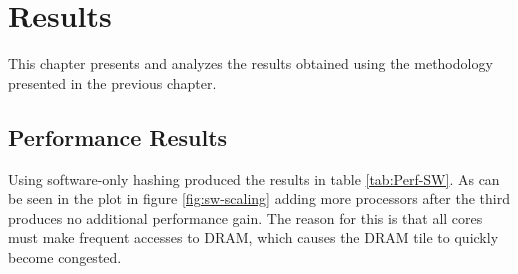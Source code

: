 \chapter{Results}

This chapter presents and analyzes the results obtained using the methodology
presented in the previous chapter.

\section{Performance Results}


 
Using software-only hashing produced the results in table \ref{tab:Perf-SW}. As can be seen
in the plot in figure \ref{fig:sw-scaling} adding more processors after the third produces no
additional performance gain. 
The reason for this is that all cores must make frequent accesses to DRAM, which causes the
DRAM tile to quickly become congested.

